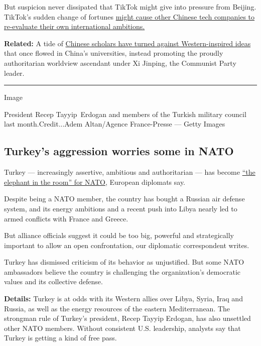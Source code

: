 But suspicion never dissipated that TikTok might give into pressure from
Beijing. TikTok's sudden change of fortunes
\href{https://www.nytimes.com/2020/08/03/technology/tiktok-bytedance-us-china.html}{might
cause other Chinese tech companies to re-evaluate their own
international ambitions.}

\textbf{Related:} A tide of
\href{https://www.nytimes.com/2020/08/02/world/asia/china-hong-kong-national-security-law.html}{Chinese
scholars have turned against Western-inspired ideas} that once flowed in
China's universities, instead promoting the proudly authoritarian
worldview ascendant under Xi Jinping, the Communist Party leader.

\begin{center}\rule{0.5\linewidth}{\linethickness}\end{center}

Image

President Recep Tayyip~Erdogan and members of the Turkish military
council last month.Credit...Adem Altan/Agence France-Presse --- Getty
Images

\hypertarget{turkeys-aggression-worries-some-in-nato}{%
\subsection{Turkey's aggression worries some in
NATO}\label{turkeys-aggression-worries-some-in-nato}}

Turkey --- increasingly assertive, ambitious and authoritarian --- has
become
\href{https://www.nytimes.com/2020/08/03/world/europe/turkey-nato.html}{``the
elephant in the room'' for NATO}, European diplomats say.

Despite being a NATO member, the country has bought a Russian air
defense system, and its energy ambitions and a recent push into Libya
nearly led to armed conflicts with France and Greece.

But alliance officials suggest it could be too big, powerful and
strategically important to allow an open confrontation, our diplomatic
correspondent writes.

Turkey has dismissed criticism of its behavior as unjustified. But some
NATO ambassadors believe the country is challenging the organization's
democratic values and its collective defense.

\textbf{Details:} Turkey is at odds with its Western allies over Libya,
Syria, Iraq and Russia, as well as the energy resources of the eastern
Mediterranean. The strongman rule of Turkey's president, Recep Tayyip
Erdogan, has also unsettled other NATO members. Without consistent U.S.
leadership, analysts say that Turkey is getting a kind of free pass.

